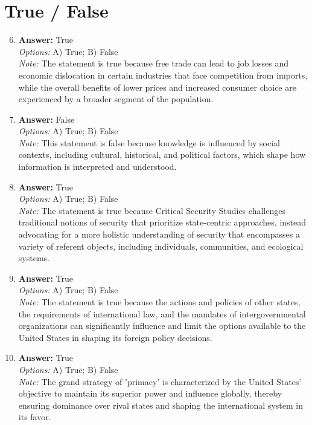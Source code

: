 \documentclass[12pt]{article}
\begin{document}
\section*{True / False}
\begin{enumerate}[label=\arabic*.]
\setcounter{enumi}{5}
\item \textbf{Answer:} True
\\ \textit{Options:} A) True; B) False
\\ \textit{Note:} The statement is true because free trade can lead to job losses and economic dislocation in certain industries that face competition from imports, while the overall benefits of lower prices and increased consumer choice are experienced by a broader segment of the population.
\item \textbf{Answer:} False
\\ \textit{Options:} A) True; B) False
\\ \textit{Note:} This statement is false because knowledge is influenced by social contexts, including cultural, historical, and political factors, which shape how information is interpreted and understood.
\item \textbf{Answer:} True
\\ \textit{Options:} A) True; B) False
\\ \textit{Note:} The statement is true because Critical Security Studies challenges traditional notions of security that prioritize state-centric approaches, instead advocating for a more holistic understanding of security that encompasses a variety of referent objects, including individuals, communities, and ecological systems.
\item \textbf{Answer:} True
\\ \textit{Options:} A) True; B) False
\\ \textit{Note:} The statement is true because the actions and policies of other states, the requirements of international law, and the mandates of intergovernmental organizations can significantly influence and limit the options available to the United States in shaping its foreign policy decisions.
\item \textbf{Answer:} True
\\ \textit{Options:} A) True; B) False
\\ \textit{Note:} The grand strategy of 'primacy' is characterized by the United States' objective to maintain its superior power and influence globally, thereby ensuring dominance over rival states and shaping the international system in its favor.
\end{enumerate}
\end{document}
